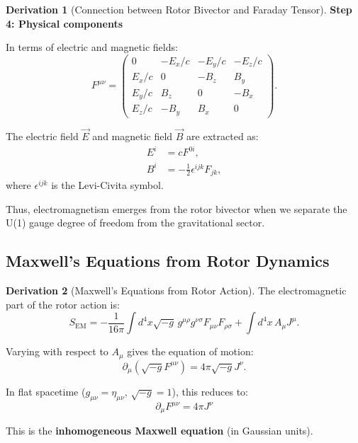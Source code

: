 \documentclass[12pt,a4paper]{article}
\theoremstyle{definition}
\newtheorem{derivation}{Derivation}[section]
\theoremstyle{remark}
\begin{document}
\begin{derivation}[Connection between Rotor Bivector and Faraday Tensor]
\textbf{Step 4: Physical components}

In terms of electric and magnetic fields:
\begin{equation}
F^{\mu\nu} = \begin{pmatrix}
0 & -E_x/c & -E_y/c & -E_z/c \\
E_x/c & 0 & -B_z & B_y \\
E_y/c & B_z & 0 & -B_x \\
E_z/c & -B_y & B_x & 0
\end{pmatrix}.
\end{equation}

The electric field $\vec{E}$ and magnetic field $\vec{B}$ are extracted as:
\begin{align}
E^i &= c F^{0i}, \\
B^i &= -\frac{1}{2} \epsilon^{ijk} F_{jk},
\end{align}
where $\epsilon^{ijk}$ is the Levi-Civita symbol.
\end{derivation}

Thus, electromagnetism emerges from the rotor bivector when we separate the U(1) gauge degree of freedom from the gravitational sector.

\subsection{Maxwell's Equations from Rotor Dynamics}

\begin{derivation}[Maxwell's Equations from Rotor Action]

The electromagnetic part of the rotor action is:
\begin{equation}
S_{\text{EM}} = -\frac{1}{16\pi} \int d^4x \sqrt{-g} \, g^{\mu\rho} g^{\nu\sigma} F_{\mu\nu} F_{\rho\sigma} + \int d^4x \, A_\mu J^\mu.
\end{equation}

Varying with respect to $A_\mu$ gives the equation of motion:
\begin{equation}
\partial_\mu \left(\sqrt{-g} F^{\mu\nu}\right) = 4\pi \sqrt{-g} J^\nu.
\end{equation}

In flat spacetime ($g_{\mu\nu} = \eta_{\mu\nu}$, $\sqrt{-g} = 1$), this reduces to:
\begin{equation}
\boxed{\partial_\mu F^{\mu\nu} = 4\pi J^\nu}
\end{equation}

This is the \textbf{inhomogeneous Maxwell equation} (in Gaussian units).
\end{derivation}
\end{document}
